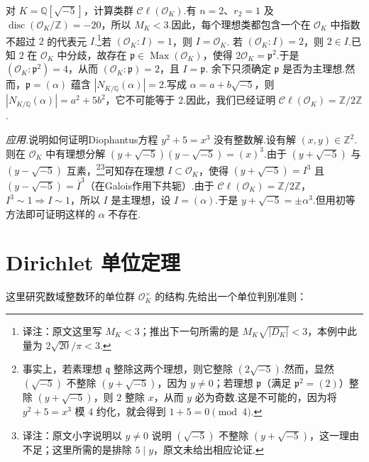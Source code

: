 \begin{example*}\label{ex:nt-5-2-minus-five}
对 $K=\mathbb Q[\sqrt{-5}]$，计算类群 $\mathcal C\ell(\mathcal O_K)$.有 $n=2$、$r_2=1$ 及 $\operatorname{disc}(\mathcal O_K/\mathbb Z)=-20$，所以 $M_K<3$.因此，每个理想类都包含一个在 $\mathcal O_K$ 中指数不超过 $2$ 的代表元 $I$.\footnote{译注：原文这里写 $M_K<3$；推出下一句所需的是 $M_K\sqrt{|D_K|}<3$，本例中此量为 $2\sqrt{20}/\pi<3$.}若 $(\mathcal O_K:I)=1$，则 $I=\mathcal O_K$.
若 $(\mathcal O_K:I)=2$，则 $2\in I$.已知 $2$ 在 $\mathcal O_K$ 中分歧，故存在 $\mathfrak p\in\operatorname{Max}(\mathcal O_K)$，使得 $2\mathcal O_K=\mathfrak p^2$.于是 $(\mathcal O_K:\mathfrak p^2)=4$，从而 $(\mathcal O_K:\mathfrak p)=2$，且 $I=\mathfrak p$.
余下只须确定 $\mathfrak p$ 是否为主理想.然而，$\mathfrak p=(\alpha)$ 蕴含 $|N_{K/\mathbb Q}(\alpha)|=2$.写成 $\alpha=a+b\sqrt{-5}$，则 $|N_{K/\mathbb Q}(\alpha)|=a^2+5b^2$，它不可能等于 $2$.因此，我们已经证明 $\mathcal C\ell(\mathcal O_K)=\mathbb Z/2\mathbb Z$.
\end{example*}
\emph{应用.}说明如何证明Diophantus方程 $y^2+5=x^3$ 没有整数解.设有解 $(x,y)\in\mathbb Z^2$.则在 $\mathcal O_K$ 中有理想分解 $(y+\sqrt{-5})(y-\sqrt{-5})=(x)^3$.由于 $(y+\sqrt{-5})$ 与 $(y-\sqrt{-5})$ 互素，\footnote{事实上，若素理想 $\mathfrak q$ 整除这两个理想，则它整除 $(2\sqrt{-5})$.然而，显然 $(\sqrt{-5})$ 不整除 $(y+\sqrt{-5})$，因为 $y\ne0$；若理想 $\mathfrak p$（满足 $\mathfrak p^2=(2)$）整除 $(y+\sqrt{-5})$，则 $2$ 整除 $x$，从而 $y$ 必为奇数.这是不可能的，因为将 $y^2+5=x^3$ 模 $4$ 约化，就会得到 $1+5=0\pmod4$.}\footnote{译注：原文小字说明以 $y\ne0$ 说明 $(\sqrt{-5})$ 不整除 $(y+\sqrt{-5})$，这一理由不足；这里所需的是排除 $5\mid y$，原文未给出相应论证.}可知存在理想 $I\subset\mathcal O_K$，使得 $(y+\sqrt{-5})=I^3$ 且 $(y-\sqrt{-5})=\overline I^{3}$（在Galois作用下共轭）.由于 $\mathcal C\ell(\mathcal O_K)=\mathbb Z/2\mathbb Z$，$I^3\sim1\Rightarrow I\sim1$，所以 $I$ 是主理想，设 $I=(\alpha)$.于是 $y+\sqrt{-5}=\pm\alpha^3$.但用初等方法即可证明这样的 $\alpha$ 不存在.

\section{Dirichlet 单位定理}\label{sec:nt-5-3}
这里研究数域整数环的单位群 $\mathcal O_K^\times$ 的结构.先给出一个单位判别准则：
